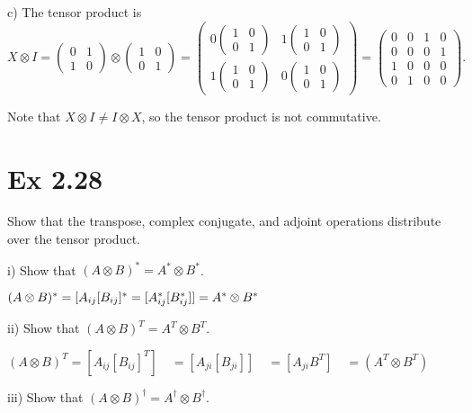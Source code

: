 \documentclass{article}
\newcommand{\0}{{$|0\rangle$}}
\newcommand{\1}{{$|1\rangle$}}
\begin{document}
c) The tensor product is  
$$
X \otimes I = \begin{pmatrix} 0 & 1 \\ 1 & 0 \end{pmatrix} \otimes \begin{pmatrix} 1 & 0 \\ 0 & 1 \end{pmatrix} = \begin{pmatrix} 0 \begin{pmatrix} 1 & 0 \\ 0 & 1 \end{pmatrix} & 1 \begin{pmatrix} 1 & 0 \\ 0 & 1 \end{pmatrix} \\ 1 \begin{pmatrix} 1 & 0 \\ 0 & 1 \end{pmatrix} & 0 \begin{pmatrix} 1 & 0 \\ 0 & 1 \end{pmatrix} \end{pmatrix} = \begin{pmatrix} 0 & 0 & 1 & 0 \\ 0 & 0 & 0 & 1 \\ 1 & 0 & 0 & 0 \\ 0 & 1 & 0 & 0 \end{pmatrix}.
$$

Note that $ X \otimes I \neq I \otimes X $, so the tensor product is not commutative.

\newpage
\section*{Ex 2.28 } 
Show that the transpose, complex conjugate, and adjoint operations distribute over the tensor product.

i) Show that $ (A \otimes B)^* = A^* \otimes B^* $.

$( A \otimes B)^* = [A_{ij}[B_{ij}]^* \\
= [A_{ij}^* [B_{ij}^*]] \\
= A^* \otimes B^* $

ii) Show that $ (A \otimes B)^T = A^T \otimes B^T $.

$(A \otimes B)^T = [A_{ij}[B_{ij}]^T] \quad = [A_{ji} [B_{ji}]] \quad = [A_{ji} B^T] \quad = (A^T \otimes B^T)$

iii) Show that $ (A \otimes B)^\dagger = A^\dagger \otimes B^\dagger $.
\end{document}
